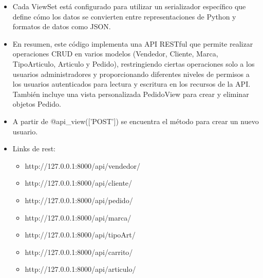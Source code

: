 \documentclass{article}
\begin{document}
\begin{itemize}
\begin{itemize}
        \end{itemize}
        \item Cada ViewSet está configurado para utilizar un serializador específico que define cómo los datos se convierten entre representaciones de Python y formatos de datos como JSON.
        \item En resumen, este código implementa una API RESTful que permite realizar operaciones CRUD en varios modelos (Vendedor, Cliente, Marca, TipoArticulo, Articulo y Pedido), restringiendo ciertas operaciones solo a los usuarios administradores y proporcionando diferentes niveles de permisos a los usuarios autenticados para lectura y escritura en los recursos de la API. También incluye una vista personalizada PedidoView para crear y eliminar objetos Pedido.
        \item A partir de @api\_view(['POST']) se encuentra el método para crear un nuevo usuario.
    \end{itemize}
    
    \begin{itemize}
        \item Links de rest:
        \begin{itemize}
            \item http://127.0.0.1:8000/api/vendedor/
            \item http://127.0.0.1:8000/api/cliente/
            \item http://127.0.0.1:8000/api/pedido/
            \item http://127.0.0.1:8000/api/marca/
            \item http://127.0.0.1:8000/api/tipoArt/
            \item http://127.0.0.1:8000/api/carrito/
            \item http://127.0.0.1:8000/api/articulo/
        \end{itemize}
    \end{itemize}
\end{document}
